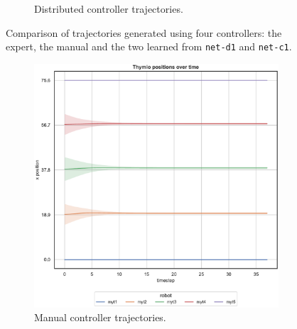 \begin{figure}[H]
\begin{center}
\begin{subfigure}[h]{0.49\textwidth}
			\caption{Distributed controller trajectories.}
		\end{subfigure}
	\end{center}
	\vspace{-0.5cm}
	\caption[Evaluation of the trajectories learned by \texttt{net-c1}.]{Comparison 
	of trajectories generated using four controllers: the expert, the manual and the 
	two learned from \texttt{net-d1} and \texttt{net-c1}.}
\end{figure}

\medskip
\begin{figure}[!htb]\ContinuedFloat
	\begin{center}
		\begin{subfigure}[h]{0.49\textwidth}
			\centering			
			\includegraphics[width=\textwidth]{contents/images/net-d1/position-overtime-manual}%
			\caption{Manual controller trajectories.}
		\end{subfigure}
		\hfill
		\begin{subfigure}[h]{0.49\textwidth}
			\centering

\end{subfigure}
\end{center}
\end{figure}
